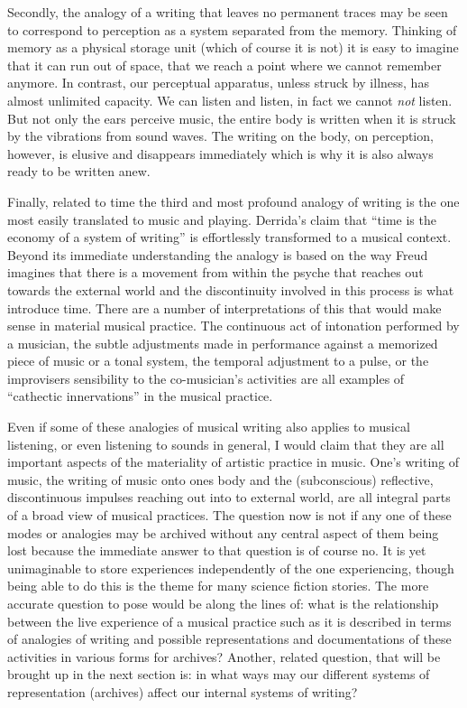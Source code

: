 \documentclass[11pt,a4paper]{article}
\begin{document}
Secondly, the analogy of a writing that leaves no permanent traces may be seen to correspond to perception as a system separated from the memory. Thinking of memory as a physical storage unit (which of course it is not) it is easy to imagine that it can run out of space, that we reach a point where we cannot remember anymore. In contrast, our perceptual apparatus, unless struck by illness, has almost unlimited capacity. We can listen and listen, in fact we cannot \emph{not} listen. But not only the ears perceive music, the entire body is written when it is struck by the vibrations from sound waves. The writing on the body, on perception, however, is elusive and disappears immediately which is why it is also always ready to be written anew.

Finally, related to time the third and most profound analogy of writing is the one most easily translated to music and playing. Derrida's claim that ``time is the economy of a system of writing'' \citep[p. 284]{der78} is effortlessly transformed to a musical context. Beyond its immediate understanding the analogy is based on the way Freud imagines that there is a movement from within the psyche that reaches out towards the external world and the discontinuity involved in this process is what introduce time. There are a number of interpretations of this that would make sense in material musical practice. The continuous act of intonation performed by a musician, the subtle adjustments made in performance against a memorized piece of music or a tonal system, the temporal adjustment to a pulse, or the improvisers sensibility to the co-musician's activities are all examples of ``cathectic innervations'' in the musical practice.

Even if some of these analogies of musical writing also applies to musical listening, or even listening to sounds in general, I would claim that they are all important aspects of the materiality of artistic practice in music. One's writing of music, the writing of music onto ones body and the (subconscious) reflective, discontinuous impulses reaching out into to external world, are all integral parts of a broad view of musical practices. The question now is not if any one of these modes or analogies may be archived without any central aspect of them being lost because the immediate answer to that question is of course no. It is yet unimaginable to store experiences independently of the one experiencing, though being able to do this is the theme for many science fiction stories. The more accurate question to pose would be along the lines of: what is the relationship between the live experience of a musical practice such as it is described in terms of analogies of writing and possible representations and documentations of these activities in various forms for archives? Another, related question, that will be brought up in the next section is: in what ways may our different systems of representation (archives) affect our internal systems of writing?
\end{document}
